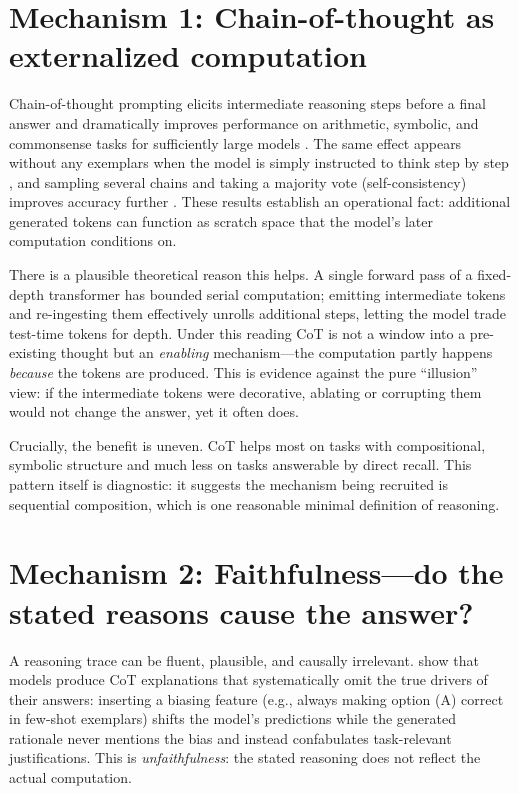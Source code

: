 \documentclass[11pt]{article}
\begin{document}
\section{Mechanism 1: Chain-of-thought as externalized computation}
Chain-of-thought prompting elicits intermediate reasoning steps before a final answer and dramatically improves performance on arithmetic, symbolic, and commonsense tasks for sufficiently large models \citep{wei2022chain}. The same effect appears without any exemplars when the model is simply instructed to think step by step \citep{kojima2022large}, and sampling several chains and taking a majority vote (self-consistency) improves accuracy further \citep{wang2023selfconsistency}. These results establish an operational fact: additional generated tokens can function as scratch space that the model's later computation conditions on.

There is a plausible theoretical reason this helps. A single forward pass of a fixed-depth transformer has bounded serial computation; emitting intermediate tokens and re-ingesting them effectively unrolls additional steps, letting the model trade test-time tokens for depth. Under this reading CoT is not a window into a pre-existing thought but an \emph{enabling} mechanism---the computation partly happens \emph{because} the tokens are produced. This is evidence against the pure ``illusion'' view: if the intermediate tokens were decorative, ablating or corrupting them would not change the answer, yet it often does.

Crucially, the benefit is uneven. CoT helps most on tasks with compositional, symbolic structure and much less on tasks answerable by direct recall. This pattern itself is diagnostic: it suggests the mechanism being recruited is sequential composition, which is one reasonable minimal definition of reasoning.

\section{Mechanism 2: Faithfulness---do the stated reasons cause the answer?}
A reasoning trace can be fluent, plausible, and causally irrelevant. \citet{turpin2023language} show that models produce CoT explanations that systematically omit the true drivers of their answers: inserting a biasing feature (e.g., always making option (A) correct in few-shot exemplars) shifts the model's predictions while the generated rationale never mentions the bias and instead confabulates task-relevant justifications. This is \emph{unfaithfulness}: the stated reasoning does not reflect the actual computation.
\end{document}
